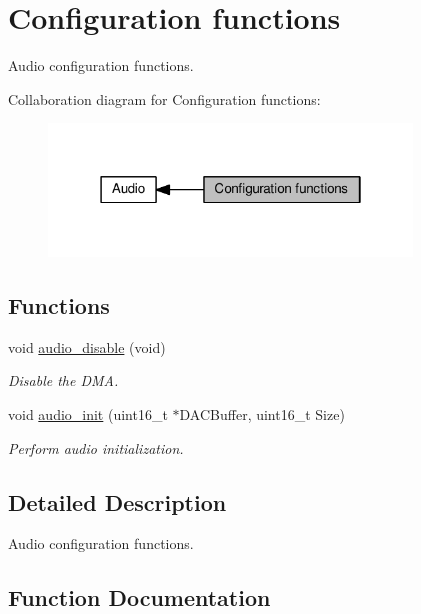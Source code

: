 \hypertarget{group___audio___init}{}\section{Configuration functions}
\label{group___audio___init}


Audio configuration functions.  


Collaboration diagram for Configuration functions\+:\nopagebreak
\begin{figure}[H]
\begin{center}
\leavevmode
\includegraphics[width=274pt]{d0/df3/group___audio___init}
\end{center}
\end{figure}
\subsection*{Functions}
\begin{DoxyCompactItemize}
\item 
void \hyperlink{group___audio___init_gafff6cd7f4332d078ce0114143cd30998}{audio\+\_\+disable} (void)
\begin{DoxyCompactList}\small\item\em Disable the D\+MA. \end{DoxyCompactList}\item 
void \hyperlink{group___audio___init_gabcda20e7d4baa315d151230fcc81ec1d}{audio\+\_\+init} (uint16\+\_\+t $\ast$D\+A\+C\+Buffer, uint16\+\_\+t Size)
\begin{DoxyCompactList}\small\item\em Perform audio initialization. \end{DoxyCompactList}\end{DoxyCompactItemize}


\subsection{Detailed Description}
Audio configuration functions. 



\subsection{Function Documentation}
